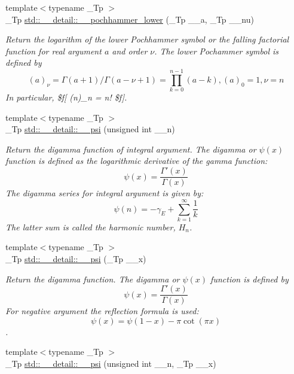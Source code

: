\begin{DoxyCompactItemize}
{\footnotesize template$<$typename \+\_\+\+Tp $>$ }\\\+\_\+\+Tp \hyperlink{namespacestd_1_1____detail_afa62487960a1980a21688783d3410afc}{std\+::\+\_\+\+\_\+detail\+::\+\_\+\+\_\+pochhammer\+\_\+lower} (\+\_\+\+Tp \+\_\+\+\_\+a, \+\_\+\+Tp \+\_\+\+\_\+nu)
\begin{DoxyCompactList}\small\item\em Return the logarithm of the lower Pochhammer symbol or the falling factorial function for real argument $ a $ and order $ \nu $. The lower Pochammer symbol is defined by \[ (a)_\nu = \Gamma(a + 1) / \Gamma(a - \nu + 1) = \prod_{k=0}^{n-1} (a - k), (a)_0 = 1, \nu = n \] In particular, \$f\mbox{[} (n)\+\_\+n = n! \$f\mbox{]}. \end{DoxyCompactList}\item 
{\footnotesize template$<$typename \+\_\+\+Tp $>$ }\\\+\_\+\+Tp \hyperlink{namespacestd_1_1____detail_a664d83a211283d0975ba40f3874c2d70}{std\+::\+\_\+\+\_\+detail\+::\+\_\+\+\_\+psi} (unsigned int \+\_\+\+\_\+n)
\begin{DoxyCompactList}\small\item\em Return the digamma function of integral argument. The digamma or $ \psi(x) $ function is defined as the logarithmic derivative of the gamma function\+: \[ \psi(x) = \frac{\Gamma'(x)}{\Gamma(x)} \] The digamma series for integral argument is given by\+: \[ \psi(n) = -\gamma_E + \sum_{k=1}^{\infty} \frac{1}{k} \] The latter sum is called the harmonic number, $ H_n $. \end{DoxyCompactList}\item 
{\footnotesize template$<$typename \+\_\+\+Tp $>$ }\\\+\_\+\+Tp \hyperlink{namespacestd_1_1____detail_ad7246a3ca90be800e6cc79c8e2360abd}{std\+::\+\_\+\+\_\+detail\+::\+\_\+\+\_\+psi} (\+\_\+\+Tp \+\_\+\+\_\+x)
\begin{DoxyCompactList}\small\item\em Return the digamma function. The digamma or $ \psi(x) $ function is defined by \[ \psi(x) = \frac{\Gamma'(x)}{\Gamma(x)} \] For negative argument the reflection formula is used\+: \[ \psi(x) = \psi(1-x) - \pi \cot(\pi x) \]. \end{DoxyCompactList}\item 
{\footnotesize template$<$typename \+\_\+\+Tp $>$ }\\\+\_\+\+Tp \hyperlink{namespacestd_1_1____detail_a96d6b8301ca54615364a53665b347f6c}{std\+::\+\_\+\+\_\+detail\+::\+\_\+\+\_\+psi} (unsigned int \+\_\+\+\_\+n, \+\_\+\+Tp \+\_\+\+\_\+x)

\end{DoxyCompactItemize}
